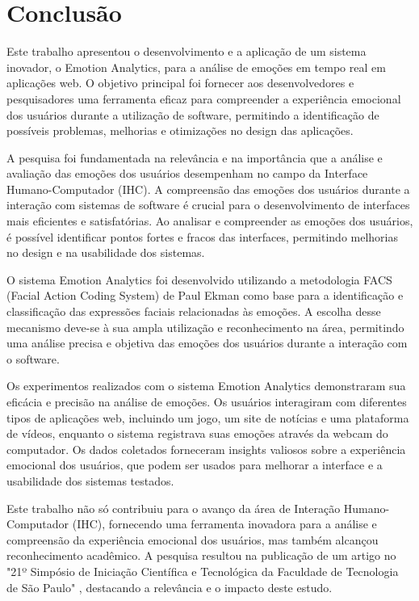 \chapter{Conclusão}

Este trabalho apresentou o desenvolvimento e a aplicação de um sistema inovador, o Emotion Analytics, para a análise de emoções em tempo real em aplicações web. O objetivo principal foi fornecer aos desenvolvedores e pesquisadores uma ferramenta eficaz para compreender a experiência emocional dos usuários durante a utilização de software, permitindo a identificação de possíveis problemas, melhorias e otimizações no design das aplicações.

A pesquisa foi fundamentada na relevância e na importância que a análise e avaliação das emoções dos usuários desempenham no campo da Interface Humano-Computador (IHC). A compreensão das emoções dos usuários durante a interação com sistemas de software é crucial para o desenvolvimento de interfaces mais eficientes e satisfatórias. Ao analisar e compreender as emoções dos usuários, é possível identificar pontos fortes e fracos das interfaces, permitindo melhorias no design e na usabilidade dos sistemas.

O sistema Emotion Analytics foi desenvolvido utilizando a metodologia FACS (Facial Action Coding System) de Paul Ekman \cite{5} como base para a identificação e classificação das expressões faciais relacionadas às emoções. A escolha desse mecanismo deve-se à sua ampla utilização e reconhecimento na área, permitindo uma análise precisa e objetiva das emoções dos usuários durante a interação com o software.

Os experimentos realizados com o sistema Emotion Analytics demonstraram sua eficácia e precisão na análise de emoções. Os usuários interagiram com diferentes tipos de aplicações web, incluindo um jogo, um site de notícias e uma plataforma de vídeos, enquanto o sistema registrava suas emoções através da webcam do computador. Os dados coletados forneceram insights valiosos sobre a experiência emocional dos usuários, que podem ser usados para melhorar a interface e a usabilidade dos sistemas testados.

Este trabalho não só contribuiu para o avanço da área de Interação Humano-Computador (IHC), fornecendo uma ferramenta inovadora para a análise e compreensão da experiência emocional dos usuários, mas também alcançou reconhecimento acadêmico. A pesquisa resultou na publicação de um artigo no "21º Simpósio de Iniciação Científica e Tecnológica da Faculdade de Tecnologia de São Paulo" \cite{25}, destacando a relevância e o impacto deste estudo.

